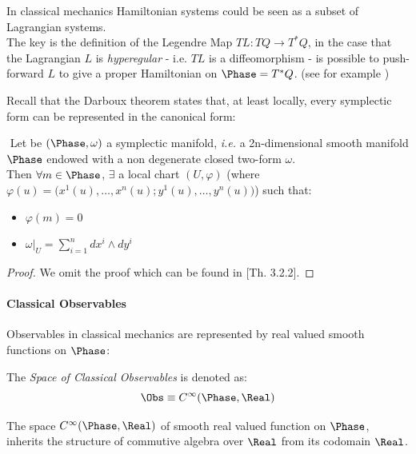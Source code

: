 \documentclass[Main]{subfiles}
\begin{document}
	\begin{remark}
		In classical mechanics Hamiltonian systems could be seen as a subset of Lagrangian systems.
		\\
		The key is the definition of the Legendre Map $TL: TQ \rightarrow T^*Q$,  in the case that the Lagrangian $L$  is \emph{hyperegular}  - i.e. $TL$ is a diffeomorphism - is possible to push-forward $L$ to give a proper Hamiltonian on $\Phase=T^*Q$. (see for example \cite{Abraham1978})
	\end{remark}	
	Recall that the Darboux theorem states that, at least locally, every symplectic form can be represented in the canonical form:
	\begin{theorem}[Darboux]
		$ $
			Let be $(\Phase, \omega)$ a symplectic manifold, \textit{i.e.}  a 2n-dimensional smooth manifold $\Phase$ endowed with a non degenerate closed two-form $\omega$.\\
			Then
			 $\forall m\in \Phase$,  $\exists$ a local chart  $(U,\varphi)$ (where $\varphi(u) = \big(x^1(u), \ldots, x^n(u); y^1(u),\ldots, y^n(u) \big)$) such that:
					\begin{itemize}
						\item $\varphi(m) =0$
						\item	$\omega \big\vert_U = \sum_{i=1}^n dx^i \wedge dy^i$
					\end{itemize}
	\end{theorem}
	\begin{proof}
		We omit the proof which can be found in \cite{Abraham1978}[Th. 3.2.2].
	\end{proof}		
		
	\paragraph{Classical Observables}
		Observables in classical mechanics are represented by real valued smooth functions on $\Phase$:
	\begin{definition}
		The \emph{Space of Classical Observables} is denoted as:
		\begin{displaymath}
			\Obs \equiv		C^\infty(\Phase,\Real)
		\end{displaymath}
	\end{definition}
%
		The space  $C^\infty(\Phase,\Real)$ of smooth real valued function on $\Phase$,  inherits the structure of commutive algebra over $\Real$ from its codomain $\Real$.
\end{document}
